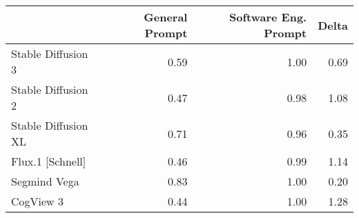 \begin{tabular}{lrrr}
\toprule
 & General Prompt & Software Eng. Prompt & Delta \\
\midrule
Stable Diffusion 3 & 0.59 & 1.00 & 0.69 \\
Stable Diffusion 2 & 0.47 & 0.98 & 1.08 \\
Stable Diffusion XL & 0.71 & 0.96 & 0.35 \\
Flux.1 [Schnell] & 0.46 & 0.99 & 1.14 \\
Segmind Vega & 0.83 & 1.00 & 0.20 \\
CogView 3 & 0.44 & 1.00 & 1.28 \\
\bottomrule
\end{tabular}
